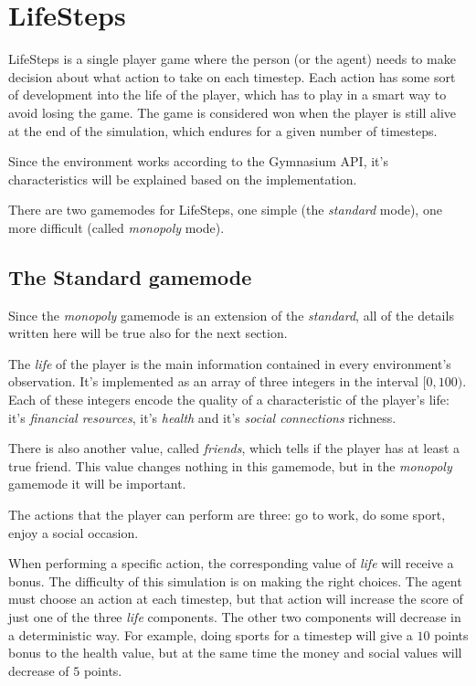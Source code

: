 \documentclass{article}
\begin{document}
\section{LifeSteps}
LifeSteps is a single player game where the person (or the agent) needs to make decision about what action to take on each timestep. Each action has some sort of development into the life of the player, which has to play in a smart way to avoid losing the game. The game is considered won when the player is still alive at the end of the simulation, which endures for a given number of timesteps.

Since the environment works according to the Gymnasium API, it's characteristics will be explained based on the implementation.

There are two gamemodes for LifeSteps, one simple (the \textit{standard} mode), one more difficult (called \textit{monopoly} mode).

\subsection{The Standard gamemode}
Since the \textit{monopoly} gamemode is an extension of the \textit{standard}, all of the details written here will be true also for the next section.

The \textit{life} of the player is the main information contained in every environment's observation. It's implemented as an array of three integers in the interval \([0, 100)\). Each of these integers encode the quality of a characteristic of the player's life: it's \textit{financial resources}, it's \textit{health} and it's \textit{social connections} richness.

There is also another value, called \textit{friends}, which tells if the player has at least a true friend. This value changes nothing in this gamemode, but in the \textit{monopoly} gamemode it will be important. 

The actions that the player can perform are three: go to work, do some sport, enjoy a social occasion. 

When performing a specific action, the corresponding value of \textit{life} will receive a bonus. The difficulty of this simulation is on making the right choices. The agent must choose an action at each timestep, but that action will increase the score of just one of the three \textit{life} components. The other two components will decrease in a deterministic way. For example, doing sports for a timestep will give a \(10\) points bonus to the health value, but at the same time the money and social values will decrease of \(5\) points.
\end{document}
